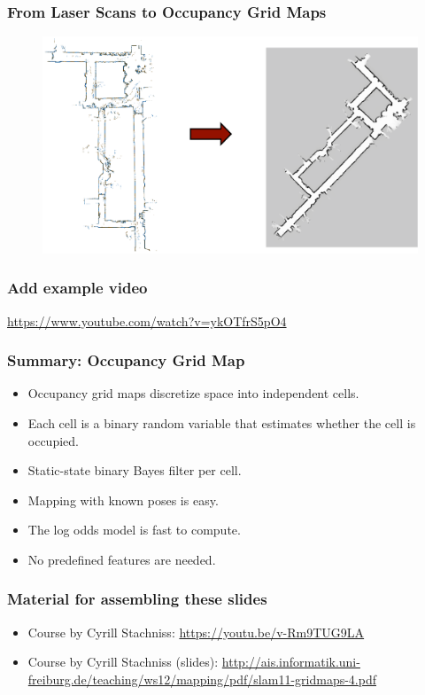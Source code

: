     \begin{frame}
    \frametitle{From Laser Scans to Occupancy Grid Maps}
    
    \begin{figure}[!h]
    \includegraphics[width=0.6\columnwidth]{./images/laser_scans_to_maps.pdf}
    \end{figure}
    
    \end{frame}
    
    \begin{frame}
    \frametitle{Add example video}
    
    \url{https://www.youtube.com/watch?v=ykOTfrS5pO4}
    
\end{frame}

\begin{frame}
    \frametitle{Summary: Occupancy Grid Map}
    \begin{itemize}
    \item Occupancy grid maps discretize space into independent cells.
    \item Each cell is a binary random variable that estimates whether the cell is occupied.
    \item Static-state binary Bayes filter per cell.
    \item Mapping with known poses is easy.
    \item The log odds model is fast to compute.
    \item No predefined features are needed.
    \end{itemize}
    
    \end{frame}
    
    \begin{frame}
    \frametitle{Material for assembling these slides}
    
    \begin{itemize}
    \item Course by Cyrill Stachniss: \url{https://youtu.be/v-Rm9TUG9LA}
    
    \item Course by Cyrill Stachniss (slides): \url{http://ais.informatik.uni-freiburg.de/teaching/ws12/mapping/pdf/slam11-gridmaps-4.pdf}
     \end{itemize}
\end{frame}
